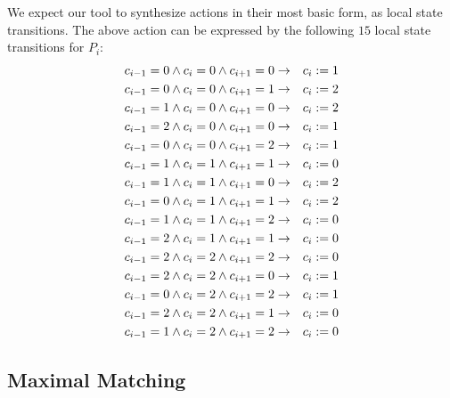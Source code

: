 We expect our tool to synthesize actions in their most basic form, as local state transitions.
The above action can be expressed by the following $15$ local state transitions for $P_i$:
\begin{eqnarray*}
 c_{i-1} = 0 \wedge c_i = 0 \wedge c_{i+1} = 0 & \to & c_i := 1 \\
 c_{i-1} = 0 \wedge c_i = 0 \wedge c_{i+1} = 1 & \to & c_i := 2 \\
 c_{i-1} = 1 \wedge c_i = 0 \wedge c_{i+1} = 0 & \to & c_i := 2 \\
 c_{i-1} = 2 \wedge c_i = 0 \wedge c_{i+1} = 0 & \to & c_i := 1 \\
 c_{i-1} = 0 \wedge c_i = 0 \wedge c_{i+1} = 2 & \to & c_i := 1 \\
 c_{i-1} = 1 \wedge c_i = 1 \wedge c_{i+1} = 1 & \to & c_i := 0 \\
 c_{i-1} = 1 \wedge c_i = 1 \wedge c_{i+1} = 0 & \to & c_i := 2 \\
 c_{i-1} = 0 \wedge c_i = 1 \wedge c_{i+1} = 1 & \to & c_i := 2 \\
 c_{i-1} = 1 \wedge c_i = 1 \wedge c_{i+1} = 2 & \to & c_i := 0 \\
 c_{i-1} = 2 \wedge c_i = 1 \wedge c_{i+1} = 1 & \to & c_i := 0 \\
 c_{i-1} = 2 \wedge c_i = 2 \wedge c_{i+1} = 2 & \to & c_i := 0 \\
 c_{i-1} = 2 \wedge c_i = 2 \wedge c_{i+1} = 0 & \to & c_i := 1 \\
 c_{i-1} = 0 \wedge c_i = 2 \wedge c_{i+1} = 2 & \to & c_i := 1 \\
 c_{i-1} = 2 \wedge c_i = 2 \wedge c_{i+1} = 1 & \to & c_i := 0 \\
 c_{i-1} = 1 \wedge c_i = 2 \wedge c_{i+1} = 2 & \to & c_i := 0
\end{eqnarray*}

\subsection{Maximal Matching}


